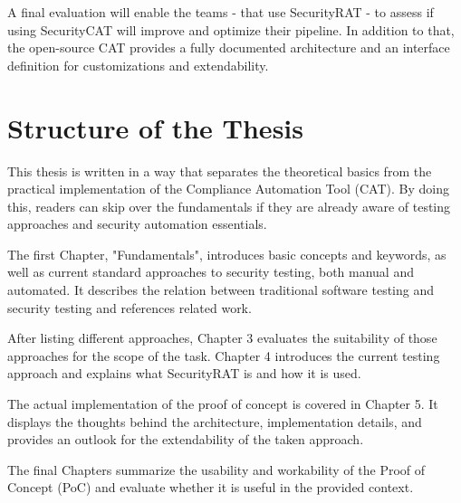 A final evaluation will enable the teams - that use SecurityRAT - to assess if using SecurityCAT will improve and optimize their pipeline. In addition to that, the open-source CAT provides a fully documented architecture and an interface definition for customizations and extendability.


\section{Structure of the Thesis}
This thesis is written in a way that separates the theoretical basics from the practical implementation of the Compliance Automation Tool (CAT). By doing this, readers can skip over the fundamentals if they are already aware of testing approaches and security automation essentials. 

The first Chapter, "Fundamentals", introduces basic concepts and keywords, as well as current standard approaches to security testing, both manual and automated. It describes the relation between traditional software testing and security testing and references related work.

After listing different approaches, Chapter 3 evaluates the suitability of those approaches for the scope of the task. 
Chapter 4 introduces the current testing approach and explains what SecurityRAT is and how it is used.

The actual implementation of the proof of concept is covered in Chapter 5. It displays the thoughts behind the architecture, implementation details, and provides an outlook for the extendability of the taken approach.

The final Chapters summarize the usability and workability of the Proof of Concept (PoC) and evaluate whether it is useful in the provided context.